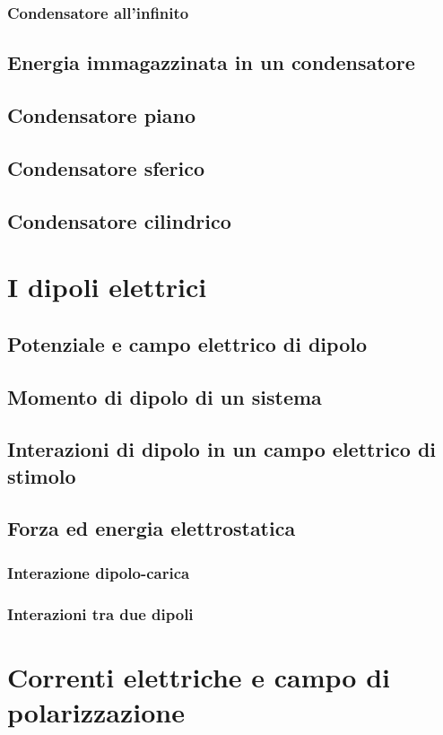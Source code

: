 \documentclass{book}
\begin{document}
\subsection{Condensatore all'infinito}
\section{Energia immagazzinata in un condensatore}
\section{Condensatore piano}
\section{Condensatore sferico}
\section{Condensatore cilindrico}

\chapter{I dipoli elettrici}
\section{Potenziale e campo elettrico di dipolo}
\section{Momento di dipolo di un sistema}
\section{Interazioni di dipolo in un campo elettrico di stimolo}
\section{Forza ed energia elettrostatica}
\subsection{Interazione dipolo-carica}
\subsection{Interazioni tra due dipoli}

\chapter{Correnti elettriche e campo di polarizzazione}
\end{document}
